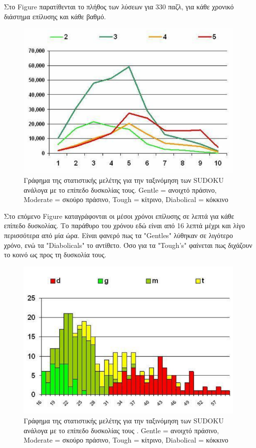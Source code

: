 \documentclass[12pt]{book}
\theoremstyle{definition}
\begin{document}
Στο Figure παρατίθενται το πλήθος των λύσεων για 330 παζλ, για κάθε χρονικό διάστημα επίλυσης και κάθε βαθμό.

\begin{figure}[h]
	\centering	
	\includegraphics[scale=0.45]{Figures/stat1.png}
	\caption{Γράφημα της στατιστικής μελέτης για την ταξινόμηση των SUDOKU ανάλογα με το επίπεδο δυσκολίας τους. Gentle = ανοιχτό πράσινο, Moderate = σκούρο πράσινο, Tough = κίτρινο, Diabolical = κόκκινο}
\end{figure} 

Στο επόμενο Figure καταγράφονται οι μέσοι χρόνοι επίλυσης σε λεπτά για κάθε επίπεδο δυσκολίας. Το παράθυρο του χρόνου εδώ είναι από 16 λεπτά μέχρι και λίγο περισσότερα από μία ώρα. Είναι φανερό πως τα "Gentles" λύθηκαν σε λιγότερο χρόνο, ενώ τα "Diabolicals" το αντίθετο. Όσο για τα "Tough's" φαίνεται πως διχάζουν το κοινό ως προς τη δυσκολία τους.

\begin{figure}[h]
	\centering	
	\includegraphics[scale=0.55]{Figures/stat2.png}
	\caption{Γράφημα της στατιστικής μελέτης για την ταξινόμηση των SUDOKU ανάλογα με το επίπεδο δυσκολίας τους . Gentle = ανοιχτό πράσινο, Moderate = σκούρο πράσινο, Tough = κίτρινο, Diabolical = κόκκινο}
\end{figure} 
\end{document}

